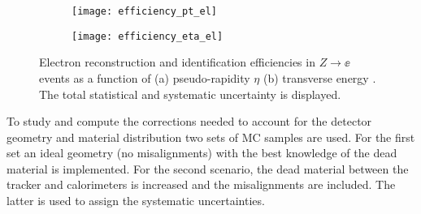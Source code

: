 \begin{figure}[t!]
\centering
\begin{subfigure}[t]{0.45\textwidth}
\texttt{[image: efficiency\_pt\_el]}
\subcaption{}
\label{fig:exp.reco.eff_pt}
\end{subfigure}
\begin{subfigure}[t]{0.45\textwidth}
\texttt{[image: efficiency\_eta\_el]}
\subcaption{}
\label{fig:exp.reco.eff_eta}
\end{subfigure}
\vspace{-0.25cm}
\caption{
Electron reconstruction and identification efficiencies in $Z\to\ee$ events as a function of (a) pseudo-rapidity $\eta$ (b) transverse energy \et.
The total statistical and systematic uncertainty is displayed. 
}
\label{fig:exp.reco.eff.el}
\end{figure} 



To study and compute the corrections needed to account for the detector geometry and material distribution
two sets of MC samples are used. For the first set an ideal geometry (no misalignments) with the best
knowledge of the dead material is implemented. For the second scenario, the dead material between the
tracker and calorimeters is increased and the misalignments are included. The latter is used to assign the
systematic uncertainties.








